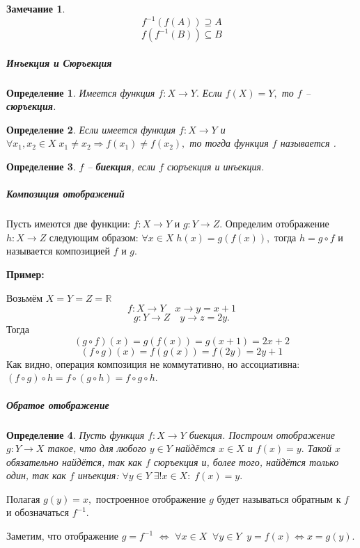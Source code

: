 \documentclass{article}
\newtheorem{Remark}{Замечание}[section]
\newtheorem{Definition}{Определение}[section]
\begin{document}
\begin{Remark}
$$f^{-1}\left(f(A)\right)\supseteq  A$$
$$f\left(f^{-1}(B)\right) \subseteq B$$
\end{Remark}

\subparagraph{Инъекция и Сюръекция}
\begin{Definition}
Имеется функция $f:X \rightarrow Y.$ Если $f(X)=Y,$ то $f$ -- {\bf сюръекция}.
\end{Definition}
\begin{Definition}
Если имеется функция $f:X \rightarrow Y$ и $\forall x_1, x_2 \in X \; x_1 \neq x_2 \Rightarrow f(x_1)\neq f(x_2),$ то тогда функция $f$ называется {}.
\end{Definition}
\begin{Definition}
$f$ -- {\bf биекция}, если $f$ сюръекция и инъекция.
\end{Definition} 

\subparagraph{Композиция отображений}
Пусть имеются две функции: $f:X \rightarrow Y$ и $g:Y \rightarrow Z.$
Определим отображение $h:X \rightarrow Z$ следующим образом: $\forall x\in X \; h(x)=g(f(x)),$ тогда $h=g\circ f$ и называется композицией $f$ и $g.$

\newpage
\par\medskip \textbf{Пример:}\par
Возьмём $X=Y=Z=\mathbb{R}$ $$f:X\rightarrow Y \quad x\rightarrow y = x+1$$ $$g:Y\rightarrow Z \quad y\rightarrow z=2y.$$ Тогда $$(g\circ f)(x)=g(f(x))=g(x+1)=2x+2$$ $$(f\circ g)(x)=f(g(x))=f(2y)=2y+1$$
Как видно, операция композиция не коммутативно, но ассоциативна: $(f\circ g)\circ h = f\circ(g\circ h)=f\circ g\circ h.$

\subparagraph{Обратое отображение}
\begin{Definition}
Пусть функция $f:X\to Y$ биекция. Построим отображение $g:Y\to X$ такое, что для любого $y\in Y$ найдётся $x\in X$ и $f(x)=y.$ Такой $x$ обязательно найдётся, так как $f$ сюръекция и, более того, найдётся только один, так как $f$ инъекция: $\forall y\in Y \; \exists! x\in X: \; f(x)=y.$
\end{Definition}

Полагая $g(y)=x,$ построенное отображение $g$ будет называться обратным к $f$ и обозначаться $f^{-1}.$

Заметим, что отображение $g=f^{-1}$ $\Leftrightarrow$ $\forall x\in X \;\; \forall y\in Y \;\; y=f(x) \Leftrightarrow x=g(y).$\\
\end{document}
